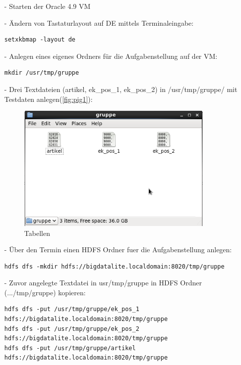 \begin{itemize}
\item[-] Starten der Oracle 4.9 VM

\item[-] Ändern von Tastaturlayout auf DE mittels Terminaleingabe:
\begin{lstlisting}
setxkbmap -layout de
\end{lstlisting}

\item[-] Anlegen eines eigenes Ordners für die Aufgabenstellung auf der VM:
\begin{lstlisting}
mkdir /usr/tmp/gruppe
\end{lstlisting}

\item[-] Drei Textdateien (artikel, ek\_pos\_1, ek\_pos\_2) in /usr/tmp/gruppe/ mit Testdaten anlegen(\autoref{fig:pig1}):
\begin{figure}[!htb]
        \begin{minipage}{1\textwidth}
                \centering
                \includegraphics[width=0.90\textwidth]{pics/HDFS_1.png}\par\vspace{0cm}
                \caption{Tabellen}
                \label{fig:pig1}
        \end{minipage}
\end{figure}

\item[-] Über den Termin einen HDFS Ordner fuer die Aufgabenstellung anlegen:
\begin{lstlisting}
hdfs dfs -mkdir hdfs://bigdatalite.localdomain:8020/tmp/gruppe
\end{lstlisting}

\item[-] Zuvor angelegte Textdatei in usr/tmp/gruppe in HDFS Ordner (.../tmp/gruppe) kopieren:
\begin{lstlisting}
hdfs dfs -put /usr/tmp/gruppe/ek_pos_1 hdfs://bigdatalite.localdomain:8020/tmp/gruppe
hdfs dfs -put /usr/tmp/gruppe/ek_pos_2 hdfs://bigdatalite.localdomain:8020/tmp/gruppe
hdfs dfs -put /usr/tmp/gruppe/artikel hdfs://bigdatalite.localdomain:8020/tmp/gruppe
\end{lstlisting}


\end{itemize}
